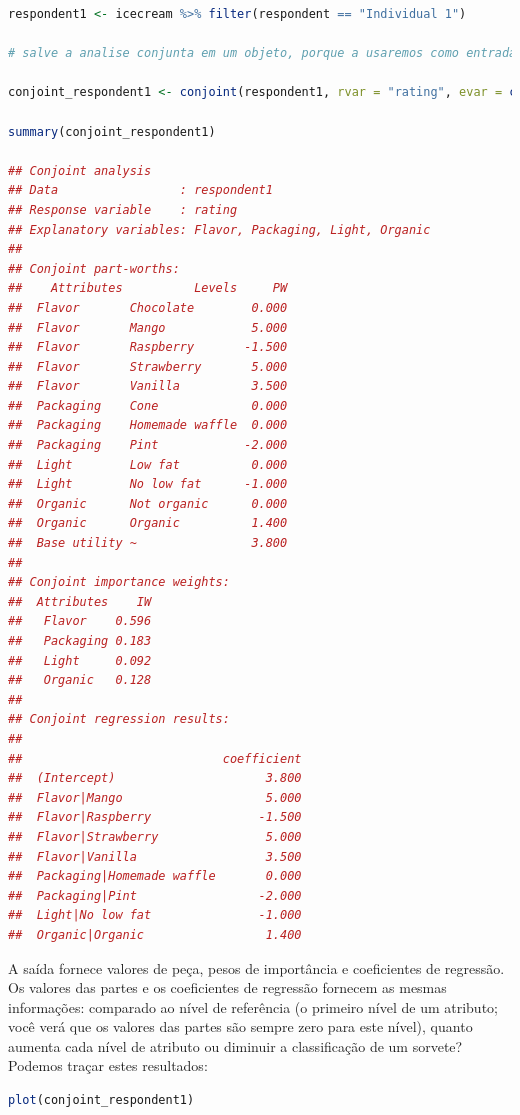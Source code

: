 \documentclass{article}
\begin{document}
\begin{lstlisting}[language=R]
respondent1 <- icecream %>% filter(respondent == "Individual 1")

# salve a analise conjunta em um objeto, porque a usaremos como entrada para summary(), plot(), and predict()

conjoint_respondent1 <- conjoint(respondent1, rvar = "rating", evar = c("Flavor","Packaging","Light","Organic")) 

summary(conjoint_respondent1)

## Conjoint analysis
## Data                 : respondent1 
## Response variable    : rating 
## Explanatory variables: Flavor, Packaging, Light, Organic 
## 
## Conjoint part-worths:
##    Attributes          Levels     PW
##  Flavor       Chocolate        0.000
##  Flavor       Mango            5.000
##  Flavor       Raspberry       -1.500
##  Flavor       Strawberry       5.000
##  Flavor       Vanilla          3.500
##  Packaging    Cone             0.000
##  Packaging    Homemade waffle  0.000
##  Packaging    Pint            -2.000
##  Light        Low fat          0.000
##  Light        No low fat      -1.000
##  Organic      Not organic      0.000
##  Organic      Organic          1.400
##  Base utility ~                3.800
## 
## Conjoint importance weights:
##  Attributes    IW
##   Flavor    0.596
##   Packaging 0.183
##   Light     0.092
##   Organic   0.128
## 
## Conjoint regression results:
## 
##                            coefficient
##  (Intercept)                     3.800
##  Flavor|Mango                    5.000
##  Flavor|Raspberry               -1.500
##  Flavor|Strawberry               5.000
##  Flavor|Vanilla                  3.500
##  Packaging|Homemade waffle       0.000
##  Packaging|Pint                 -2.000
##  Light|No low fat               -1.000
##  Organic|Organic                 1.400
\end{lstlisting}


A saída fornece valores de peça, pesos de importância e coeficientes de regressão. Os valores das partes e os coeficientes de regressão fornecem as mesmas informações: comparado ao nível de referência (o primeiro nível de um atributo; você verá que os valores das partes são sempre zero para este nível), quanto aumenta cada nível de atributo ou diminuir a classificação de um sorvete? Podemos traçar estes resultados:

\begin{lstlisting}[language=R]
plot(conjoint_respondent1)
\end{lstlisting}
\end{document}
